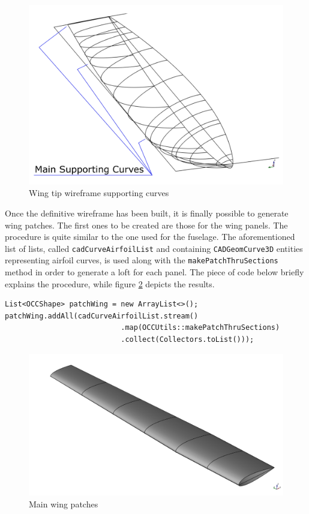 % 
\begin{figure}[H]
\centering
\includegraphics[scale=0.35]{Immagini/Capitolo3/wingtip_4}
\caption{Wing tip wireframe supporting curves}
\label{fig:WingTip2}
\end{figure}
% 

\bigskip
\noindent
Once the definitive wireframe has been built, it is finally possible to generate wing patches. The first ones to be created are those for the wing panels. The procedure is quite similar to the one used for the fuselage. The aforementioned list of lists, called \lstinline[language=Java]!cadCurveAirfoilList! and containing \lstinline[language=Java]!CADGeomCurve3D! entities representing airfoil curves, is used along with the \lstinline[language=Java]!makePatchThruSections! method in order to generate a loft for each panel. The piece of code below briefly explains the procedure, while figure \ref{fig:WingPanelPatches} depicts the results.
%
\bigskip
\begin{lstlisting}[caption={Spacings for supporting curves between main wing tip cross sections}, captionpos=b, tabsize=2, label={lst:TipSubSupCurves}]
List<OCCShape> patchWing = new ArrayList<>();
patchWing.addAll(cadCurveAirfoilList.stream()
		                   .map(OCCUtils::makePatchThruSections)
		                   .collect(Collectors.toList()));
\end{lstlisting}
% 
\begin{figure}[H]
\centering
\includegraphics[scale=0.40]{Immagini/Capitolo3/WingPatches}
\caption{Main wing patches}
\label{fig:WingPanelPatches}
\end{figure}
% 

